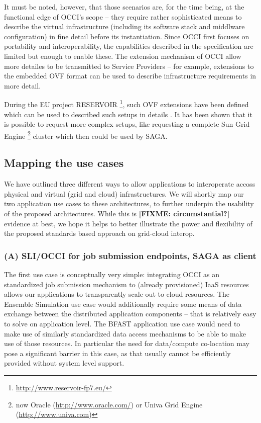 \documentclass[10pt,conference,final,letterpaper,twoside,twocolumn,]{IEEEtran}
\newcommand{\B}[1]{\textbf{#1}}
\newcommand{\F}[1]{\B{[FIXME: #1]}}
\begin{document}
 It must be noted, however, that those scenarios are, for the time
 being, at the functional edge of OCCI's scope -- they require rather
 sophisticated means to describe the virtual infrastructure (including
 its software stack and middlware configuration) in fine detail before
 its instantiation. Since OCCI first focuses on portability and
 interoperability, the capabilities described in the specification are
 limited but enough to enable these. The extension mechanism of OCCI
 allow more detailes to be transmitted to Service Providers -- for
 example, extensions to the embedded OVF format can be used to
 describe infrastructure requirements in more detail.

 During the EU project RESERVOIR
 \footnote{\url{http://www.reservoir-fp7.eu/}}, such OVF extensions
 have been defined which can be used to described such setups in
 details \cite{comsware09}.  It has been shown that it is possible to
 request more complex setups, like requesting a complete Sun Grid
 Engine \footnote{now Oracle (\url{http://www.oracle.com/}) or Univa
 Grid Engine (\url{http://www.univa.com})} cluster which then could be
 used by SAGA.


 \subsection{Mapping the use cases}

 We have outlined three different ways to allow applications to
 interoperate accoss physical and virtual (grid and cloud)
 infrastructures.  We will shortly map our two application use cases
 to these architectures, to further underpin the usability of the
 proposed architectures.  While this is \F{circumstantial?} evidence
 at best, we hope it helps to better illustrate the power and
 flexibility of the proposed standards based approach on grid-cloud
 interop.

 \subsubsection*{(A) SLI/OCCI for job submission endpoints, SAGA as client}

 The first use case is conceptually very simple: integrating OCCI as
 an standardized job submission mechanism to (already provisioned)
 IaaS resources allows our applications to transparently scale-out to
 cloud resources.  The Ensemble Simulation use case would additionally
 require some means of data exchange between the distributed
 application components -- that is relatively easy to solve on
 application level.  The BFAST application use case would need to make
 use of similarly standardized data access mechanisms to be able to
 make use of those resources.  In particular the need for data/compute
 co-location may pose a significant barrier in this case, as that
 usually cannot be efficiently provided without system level support.
  
\end{document}
